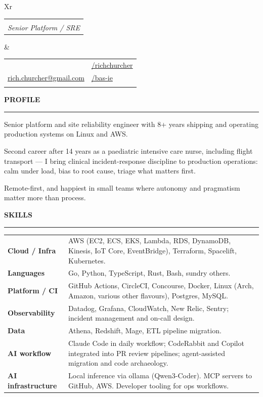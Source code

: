 \documentclass[12pt]{article}
\makeatletter
\def \fullname {Rich Churcher}
\def \subtitle {Senior Platform / SRE}
\def \linkedinicon {\faLinkedin}
\def \linkedinlink {https://linkedin.com/in/dwight-schrute/}
\def \linkedintext {/richchurcher}
\def \phoneicon {\faPhone}
\def \phonetext {+64-21-126-3919}
\def \emailicon {\faEnvelope}
\def \emaillink {mailto:rich.churcher@gmail.com}
\def \emailtext {rich.churcher@gmail.com}
\def \githubicon {\faGithub}
\def \githublink {https://github.com/bas-ie}
\def \githubtext {/bas-ie}
\def \headertype {\doublecol} %
\def \linkedin {\linkedinicon \hspace{1em}\href{\linkedinlink}{\linkedintext}}
\def \phone {\phoneicon \hspace{1em}{\phonetext}}
\def \email {\emailicon \hspace{1em}\href{\emaillink}{\emailtext}}
\def \github {\githubicon \hspace{1em}\href{\githublink}{\githubtext}}
\renewcommand{\section}[2]{\vspace{1.2ex}
  {\color{secondary}\normalsize#1\hspace{0.8em}\textbf{\MakeUppercase{#2}}}\par\vspace{-0.6ex}
  {\color{secondary}\rule{\textwidth}{0.4pt}}\vspace{-0.8ex}
}
\newcommand{\doublecol}[6]{
  \begin{tabularx}{\textwidth}{Xr}
    {
      \begin{tabular}[c]{l}
        \fontsize{28}{34}\selectfont{\color{primary}{{\textbf{\fullname}}}} \\
          {\textit{\subtitle}}
      \end{tabular}\vspace{0.8ex}
    } & {
      \begin{tabular}[c]{l@{\hspace{1em}}l}
        {\small#4} & {\small#1} \\
        {\small#5} & {\small#2} \\
        {\small#6} & {\small#3}
      \end{tabular}
    }
  \end{tabularx}
}
\newcommand{\singlecol}[6]{
  \begin{tabularx}{\textwidth}{Xr}
    {
      \begin{tabular}[b]{l}
        \fontsize{28}{34}\selectfont{\color{primary}{{\textbf{\fullname}}}} \\
        {\textit{\subtitle}} %
      \end{tabular}
    } & {
      \begin{tabular}[c]{l}
        {\small#1} \\
        {\small#2} \\
        {\small#3} \\
        {\small#4} \\
        {\small#5} \\
        {\small#6}
      \end{tabular}
    }
  \end{tabularx}
}
\makeatother
\begin{document}
\headertype{\linkedin}{\github}{}{\phone}{\email}{}

\section{\faUser}{Profile}

  \small Senior platform and site reliability engineer with 8+ years shipping and operating production systems on Linux and AWS.
  \par\vspace{0.4ex}
  Second career after 14 years as a paediatric intensive care nurse, including flight transport --- I bring clinical incident-response discipline to production operations: calm under load, bias to root cause, triage what matters first.
  \par\vspace{0.4ex}
  Remote-first, and happiest in small teams where autonomy and pragmatism matter more than process.

\section{\faWrench}{Skills}

  \begin{tabularx}{\textwidth}{@{}l@{\hspace{1.5em}}X@{}}
    \textbf{Cloud / Infra} & AWS (EC2, ECS, EKS, Lambda, RDS, DynamoDB, Kinesis, IoT Core, EventBridge), Terraform, Spacelift, Kubernetes. \\
    \textbf{Languages}     & Go, Python, TypeScript, Rust, Bash, sundry others. \\
    \textbf{Platform / CI} & GitHub Actions, CircleCI, Concourse, Docker, Linux (Arch, Amazon, various other flavours), Postgres, MySQL. \\
    \textbf{Observability} & Datadog, Grafana, CloudWatch, New Relic, Sentry; incident management and on-call design. \\
    \textbf{Data}          & Athena, Redshift, Mage, ETL pipeline migration. \\
    \textbf{AI workflow}   & Claude Code in daily workflow; CodeRabbit and Copilot integrated into PR review pipelines; agent-assisted migration and code archaeology. \\
    \textbf{AI infrastructure} & Local inference via ollama (Qwen3-Coder). MCP servers to GitHub, AWS. Developer tooling for ops workflows. \\
  \end{tabularx}
\end{document}
